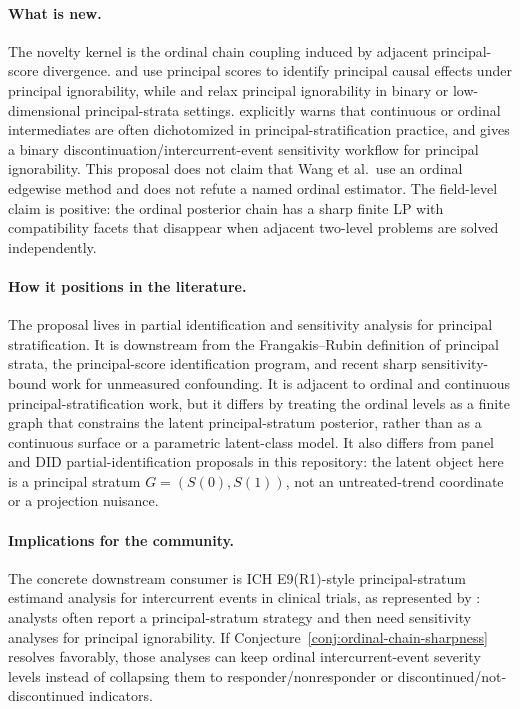 \documentclass[11pt]{article}
\theoremstyle{definition}
\theoremstyle{plain}
\theoremstyle{remark}
\begin{document}
\paragraph{What is new.}
The novelty kernel is the ordinal chain coupling induced by adjacent principal-score divergence.  \citet{DingLu2017} and \citet{JiangYangDing2022} use principal scores to identify principal causal effects under principal ignorability, while \citet{NguyenStuartScharfsteinOgburn2024} and \citet{WuAntonelli2024} relax principal ignorability in binary or low-dimensional principal-strata settings.  \citet{VanderWeele2011} explicitly warns that continuous or ordinal intermediates are often dichotomized in principal-stratification practice, and \citet{WangZhangMealliBornkamp2023} gives a binary discontinuation/intercurrent-event sensitivity workflow for principal ignorability.  This proposal does not claim that Wang et al.\ use an ordinal edgewise method and does not refute a named ordinal estimator.  The field-level claim is positive: the ordinal posterior chain has a sharp finite LP with compatibility facets that disappear when adjacent two-level problems are solved independently.

\paragraph{How it positions in the literature.}
The proposal lives in partial identification and sensitivity analysis for principal stratification.  It is downstream from the Frangakis--Rubin definition of principal strata, the principal-score identification program, and recent sharp sensitivity-bound work for unmeasured confounding.  It is adjacent to ordinal and continuous principal-stratification work, but it differs by treating the ordinal levels as a finite graph that constrains the latent principal-stratum posterior, rather than as a continuous surface or a parametric latent-class model.  It also differs from panel and DID partial-identification proposals in this repository: the latent object here is a principal stratum \(G=(S(0),S(1))\), not an untreated-trend coordinate or a projection nuisance.

\paragraph{Implications for the community.}
The concrete downstream consumer is ICH E9(R1)-style principal-stratum estimand analysis for intercurrent events in clinical trials, as represented by \citet{WangZhangMealliBornkamp2023}: analysts often report a principal-stratum strategy and then need sensitivity analyses for principal ignorability.  If Conjecture~\ref{conj:ordinal-chain-sharpness} resolves favorably, those analyses can keep ordinal intercurrent-event severity levels instead of collapsing them to responder/nonresponder or discontinued/not-discontinued indicators.
\end{document}
